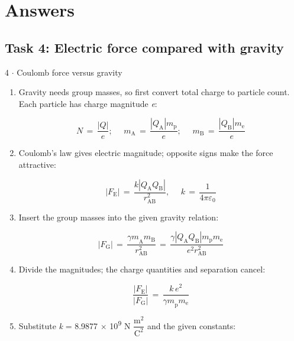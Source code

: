 \documentclass[11pt]{article}
\begin{document}
\section{Answers}
\begin{keepsection}\subsection{Task 4: Electric force compared with gravity}

\begin{workedbox}{4 \ensuremath{\cdot} Coulomb force versus gravity}
\begin{enumerate}
\item {}
Gravity needs group masses, so first convert total charge to particle count. Each particle has charge magnitude \textit{e}:

\begin{equation*}{N}\, =\, \dfrac{|{Q}|}{{e}};\, \quad \, {m}_{\mathrm{A}}\, =\, \dfrac{|{Q}_{\mathrm{A}}|{m}_{\mathrm{p}}}{{e}};\, \quad \, {m}_{\mathrm{B}}\, =\, \dfrac{|{Q}_{\mathrm{B}}|{m}_{\mathrm{e}}}{{e}}\end{equation*}
\item {}
Coulomb’s law gives electric magnitude; opposite signs make the force attractive:

\begin{equation*}|{F}_{\mathrm{E}}|\, =\, \dfrac{{k}|{Q}_{\mathrm{A}}{Q}_{\mathrm{B}}|}{{r}_{\text{AB}}^{2}},\, \quad \, {k}\, =\, \dfrac{1}{4π{ε}_{0}}\end{equation*}
\item {}
Insert the group masses into the given gravity relation:

\begin{equation*}|{F}_{\mathrm{G}}|\, =\, \dfrac{{γm}_{\mathrm{A}}{m}_{\mathrm{B}}}{{r}_{\text{AB}}^{2}}\, =\, \dfrac{{γ}|{Q}_{\mathrm{A}}{Q}_{\mathrm{B}}|{m}_{\mathrm{p}}{m}_{\mathrm{e}}}{{e}^{2}{r}_{\text{AB}}^{2}}\end{equation*}
\item {}
Divide the magnitudes; the charge quantities and separation cancel:

\begin{equation*}\dfrac{|{F}_{\mathrm{E}}|}{|{F}_{\mathrm{G}}|}\, =\, \dfrac{{k\,e}^{2}}{{γm}_{\mathrm{p}}{m}_{\mathrm{e}}}\end{equation*}
\item {}
Substitute \textit{k} = 8.9877 \ensuremath{\times} 10\textsuperscript{9} N {\small\ensuremath{\dfrac{\mathrm{m}^{2}}{\mathrm{C}^{2}}}} and the given constants:


\end{enumerate}
\end{workedbox}
\end{keepsection}
\end{document}

